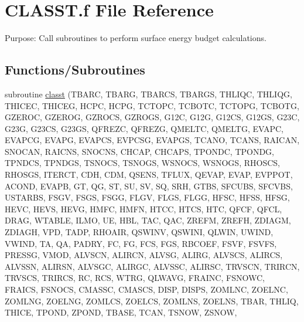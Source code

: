 \hypertarget{CLASST_8f}{}\section{C\+L\+A\+S\+S\+T.\+f File Reference}
\label{CLASST_8f}


Purpose\+: Call subroutines to perform surface energy budget calculations.  


\subsection*{Functions/\+Subroutines}
\begin{DoxyCompactItemize}
\item 
subroutine \hyperlink{CLASST_8f_afc821376816034a0c657e69bb4b06a24}{classt} (T\+B\+A\+R\+C, T\+B\+A\+R\+G, T\+B\+A\+R\+C\+S, T\+B\+A\+R\+G\+S, T\+H\+L\+I\+Q\+C, T\+H\+L\+I\+Q\+G, T\+H\+I\+C\+E\+C, T\+H\+I\+C\+E\+G, H\+C\+P\+C, H\+C\+P\+G, T\+C\+T\+O\+P\+C, T\+C\+B\+O\+T\+C, T\+C\+T\+O\+P\+G, T\+C\+B\+O\+T\+G, G\+Z\+E\+R\+O\+C, G\+Z\+E\+R\+O\+G, G\+Z\+R\+O\+C\+S, G\+Z\+R\+O\+G\+S, G12\+C, G12\+G, G12\+C\+S, G12\+G\+S, G23\+C, G23\+G, G23\+C\+S, G23\+G\+S, Q\+F\+R\+E\+Z\+C, Q\+F\+R\+E\+Z\+G, Q\+M\+E\+L\+T\+C, Q\+M\+E\+L\+T\+G, E\+V\+A\+P\+C, E\+V\+A\+P\+C\+G, E\+V\+A\+P\+G, E\+V\+A\+P\+C\+S, E\+V\+P\+C\+S\+G, E\+V\+A\+P\+G\+S, T\+C\+A\+N\+O, T\+C\+A\+N\+S, R\+A\+I\+C\+A\+N, S\+N\+O\+C\+A\+N, R\+A\+I\+C\+N\+S, S\+N\+O\+C\+N\+S, C\+H\+C\+A\+P, C\+H\+C\+A\+P\+S, T\+P\+O\+N\+D\+C, T\+P\+O\+N\+D\+G, T\+P\+N\+D\+C\+S, T\+P\+N\+D\+G\+S, T\+S\+N\+O\+C\+S, T\+S\+N\+O\+G\+S, W\+S\+N\+O\+C\+S, W\+S\+N\+O\+G\+S, R\+H\+O\+S\+C\+S, R\+H\+O\+S\+G\+S, I\+T\+E\+R\+C\+T, C\+D\+H, C\+D\+M, Q\+S\+E\+N\+S, T\+F\+L\+U\+X, Q\+E\+V\+A\+P, E\+V\+A\+P, E\+V\+P\+P\+O\+T, A\+C\+O\+N\+D, E\+V\+A\+P\+B, G\+T, Q\+G, S\+T, S\+U, S\+V, S\+Q, S\+R\+H, G\+T\+B\+S, S\+F\+C\+U\+B\+S, S\+F\+C\+V\+B\+S, U\+S\+T\+A\+R\+B\+S, F\+S\+G\+V, F\+S\+G\+S, F\+S\+G\+G, F\+L\+G\+V, F\+L\+G\+S, F\+L\+G\+G, H\+F\+S\+C, H\+F\+S\+S, H\+F\+S\+G, H\+E\+V\+C, H\+E\+V\+S, H\+E\+V\+G, H\+M\+F\+C, H\+M\+F\+N, H\+T\+C\+C, H\+T\+C\+S, H\+T\+C, Q\+F\+C\+F, Q\+F\+C\+L, D\+R\+A\+G, W\+T\+A\+B\+L\+E, I\+L\+M\+O, U\+E, H\+B\+L, T\+A\+C, Q\+A\+C, Z\+R\+E\+F\+M, Z\+R\+E\+F\+H, Z\+D\+I\+A\+G\+M, Z\+D\+I\+A\+G\+H, V\+P\+D, T\+A\+D\+P, R\+H\+O\+A\+I\+R, Q\+S\+W\+I\+N\+V, Q\+S\+W\+I\+N\+I, Q\+L\+W\+I\+N, U\+W\+I\+N\+D, V\+W\+I\+N\+D, T\+A, Q\+A, P\+A\+D\+R\+Y, F\+C, F\+G, F\+C\+S, F\+G\+S, R\+B\+C\+O\+E\+F, F\+S\+V\+F, F\+S\+V\+F\+S, P\+R\+E\+S\+S\+G, V\+M\+O\+D, A\+L\+V\+S\+C\+N, A\+L\+I\+R\+C\+N, A\+L\+V\+S\+G, A\+L\+I\+R\+G, A\+L\+V\+S\+C\+S, A\+L\+I\+R\+C\+S, A\+L\+V\+S\+S\+N, A\+L\+I\+R\+S\+N, A\+L\+V\+S\+G\+C, A\+L\+I\+R\+G\+C, A\+L\+V\+S\+S\+C, A\+L\+I\+R\+S\+C, T\+R\+V\+S\+C\+N, T\+R\+I\+R\+C\+N, T\+R\+V\+S\+C\+S, T\+R\+I\+R\+C\+S, R\+C, R\+C\+S, W\+T\+R\+G, Q\+L\+W\+A\+V\+G, F\+R\+A\+I\+N\+C, F\+S\+N\+O\+W\+C, F\+R\+A\+I\+C\+S, F\+S\+N\+O\+C\+S, C\+M\+A\+S\+S\+C, C\+M\+A\+S\+C\+S, D\+I\+S\+P, D\+I\+S\+P\+S, Z\+O\+M\+L\+N\+C, Z\+O\+E\+L\+N\+C, Z\+O\+M\+L\+N\+G, Z\+O\+E\+L\+N\+G, Z\+O\+M\+L\+C\+S, Z\+O\+E\+L\+C\+S, Z\+O\+M\+L\+N\+S, Z\+O\+E\+L\+N\+S, T\+B\+A\+R, T\+H\+L\+I\+Q, T\+H\+I\+C\+E, T\+P\+O\+N\+D, Z\+P\+O\+N\+D, T\+B\+A\+S\+E, T\+C\+A\+N, T\+S\+N\+O\+W, Z\+S\+N\+O\+W, 
\end{DoxyCompactItemize}
